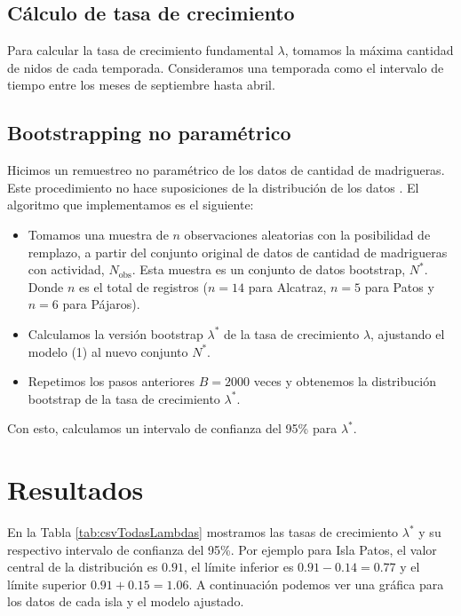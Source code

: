 \documentclass{article} %
\begin{document}
\subsection*{Cálculo de tasa de crecimiento}

Para calcular la tasa de crecimiento fundamental $\lambda$, tomamos la máxima cantidad de nidos de cada temporada. Consideramos una temporada como el intervalo de tiempo entre los meses de septiembre hasta abril.

\subsection*{Bootstrapping no paramétrico}

Hicimos un remuestreo no paramétrico de los datos de cantidad de madrigueras. Este procedimiento no hace suposiciones de la distribución de los datos \cite{carpenter2000bootstrap}. El algoritmo que implementamos es el siguiente: 

\begin{itemize}
    \item Tomamos una muestra de $n$ observaciones aleatorias con la posibilidad de remplazo, a partir del conjunto original de datos de cantidad de madrigueras con actividad, $ N_{\mbox{obs}} $. Esta muestra es un conjunto de datos bootstrap, $N^{*}$. Donde $n$ es el total de registros ($n=14$ para Alcatraz, $n=5$ para Patos y $n=6$ para Pájaros).
    \item Calculamos la versión bootstrap $\lambda^*$ de la tasa de crecimiento $\lambda$, ajustando el modelo (1) al nuevo conjunto $N^{*}$.
    \item Repetimos los pasos anteriores $B = 2000$ veces y obtenemos la distribución bootstrap de la tasa de crecimiento $\lambda^*$.
\end{itemize}

Con esto, calculamos un intervalo de confianza del 95\% para $ \lambda^* $. 

\section*{Resultados}

En la Tabla \ref{tab:csvTodasLambdas}  mostramos las tasas de crecimiento $\lambda^*$ y su respectivo intervalo de confianza del 95\%. Por ejemplo para Isla Patos, el valor central de la distribución es $0.91$, el límite inferior es $0.91 - 0.14 = 0.77$ y el límite superior $ 0.91 + 0.15 = 1.06$. A continuación podemos ver una gráfica para los datos de cada isla y el modelo ajustado.
\end{document}
